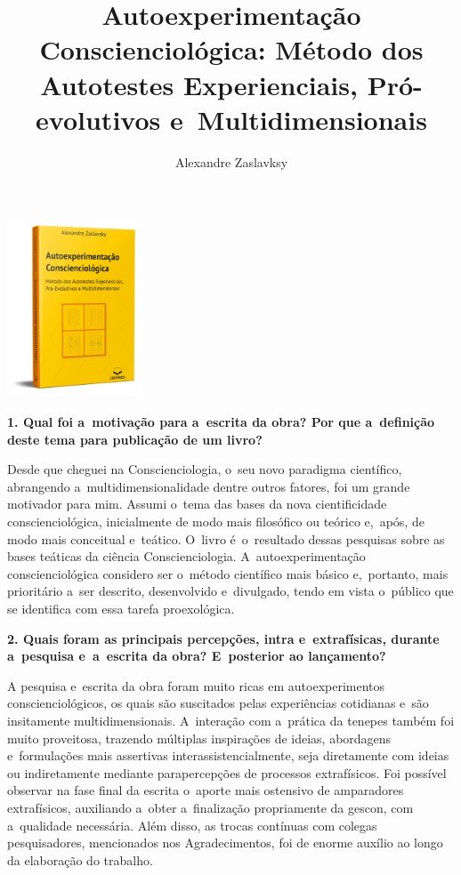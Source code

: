 \documentclass{gescons}
\author{Alexandre Zaslavksy}
\title{Autoexperimentação Conscienciológica: Método dos Autotestes Experienciais, Pró-evolutivos e~Multidimensionais}
\begin{document}
    \makeentrevistatitle

    
    \begin{multicols}{2}

\begin{center}
    \includegraphics[width=4cm]{articles/entrevista/mockups/Alexandre-Zas}
\end{center}

\textbf{1. Qual foi a~motivação para a~escrita da obra? Por que a~definição deste tema para publicação de um livro?}

Desde que cheguei na Conscienciologia, o~seu novo paradigma científico, abrangendo a~multidimensionalidade dentre outros fatores, foi um grande motivador para mim. Assumi o~tema das bases da nova cientificidade conscienciológica, inicialmente de modo mais filosófico ou teórico e,~após, de modo mais conceitual e~teático. O~livro é~o~resultado dessas pesquisas sobre as bases teáticas da ciência Conscienciologia. A~autoexperimentação conscienciológica considero ser o~método científico mais básico e,~portanto, mais prioritário a~ser descrito, desenvolvido e~divulgado, tendo em vista o~público que se identifica com essa tarefa proexológica.

\textbf{2.       Quais foram as principais percepções, intra e~extrafísicas, durante a~pesquisa e~a~escrita da obra? E~posterior ao lançamento?}

A pesquisa e~escrita da obra foram muito ricas em autoexperimentos conscienciológicos, os quais são suscitados pelas experiências cotidianas e~são insitamente multidimensionais. A~interação com a~prática da tenepes também foi muito proveitosa, trazendo múltiplas inspirações de ideias, abordagens e~formulações mais assertivas interassistencialmente, seja diretamente com ideias ou indiretamente mediante parapercepções de processos extrafísicos. Foi possível observar na fase final da escrita o~aporte mais ostensivo de amparadores extrafísicos, auxiliando a~obter a~finalização propriamente da gescon, com a~qualidade necessária. Além disso, as trocas contínuas com colegas pesquisadores, mencionados nos Agradecimentos, foi de enorme auxílio ao longo da elaboração do trabalho.




\end{multicols}
\end{document}
